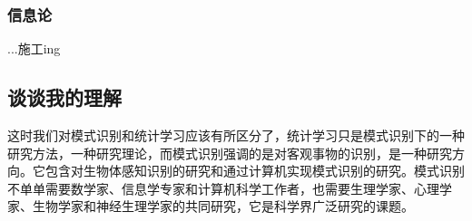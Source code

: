 \subsubsection{信息论}

...施工ing

\subsection{谈谈我的理解}

这时我们对模式识别和统计学习应该有所区分了，统计学习只是模式识别下的一种研究方法，一种研究理论，而模式识别强调的是对客观事物的识别，是一种研究方向。它包含对生物体感知识别的研究和通过计算机实现模式识别的研究。模式识别不单单需要数学家、信息学专家和计算机科学工作者，也需要生理学家、心理学家、生物学家和神经生理学家的共同研究，它是科学界广泛研究的课题。











